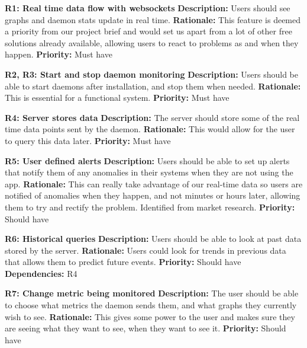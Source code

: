\documentclass{l3proj}
\begin{document}
\textbf{R1: Real time data flow with websockets} \newline
\textbf{Description:} Users should see graphs and daemon stats update in real time. \newline
\textbf{Rationale:} This feature is deemed a priority from our project brief and would set us apart from a lot of other free solutions already available, allowing users to react to problems as and when they happen. \newline
\textbf{Priority:} Must have

\textbf{R2, R3: Start and stop daemon monitoring} \newline
\textbf{Description:} Users should be able to start daemons after installation, and stop them when needed. \newline
\textbf{Rationale:} This is essential for a functional system. \newline
\textbf{Priority:} Must have

\textbf{R4: Server stores data} \newline
\textbf{Description:} The server should store some of the real time data points sent by the daemon. \newline
\textbf{Rationale:} This would allow for the user to query this data later. \newline
\textbf{Priority:} Must have

\textbf{R5: User defined alerts} \newline
\textbf{Description:} Users should be able to set up alerts that notify them of any anomalies in their systems when they are not using the app. \newline
\textbf{Rationale:} This can really take advantage of our real-time data so users are notified of anomalies when they happen, and not minutes or hours later, allowing them to try and rectify the problem. Identified from market research. \newline
\textbf{Priority:} Should have

\textbf{R6: Historical queries} \newline
\textbf{Description:} Users should be able to look at past data stored by the server. \newline
\textbf{Rationale:} Users could look for trends in previous data that allows them to predict future events. \newline
\textbf{Priority:} Should have \newline
\textbf{Dependencies:} R4

\textbf{R7: Change metric being monitored} \newline
\textbf{Description:} The user should be able to choose what metrics the daemon sends them, and what graphs they currently wish to see. \newline
\textbf{Rationale:} This gives some power to the user and makes sure they are seeing what they want to see, when they want to see it. \newline
\textbf{Priority:} Should have
\end{document}

